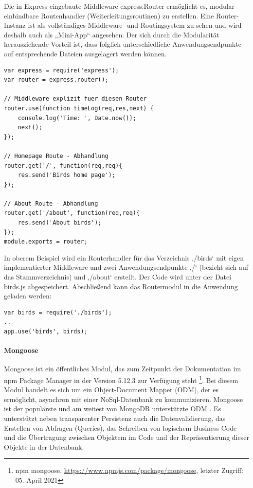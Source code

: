 \noindent
Die in Express eingebaute Middleware express.Router ermöglicht es, modular einbindbare Routenhandler (Weiterleitungsroutinen) zu erstellen. Eine Router-Instanz ist als vollständiges Middle\-ware- und Routingsystem zu sehen und wird deshalb auch als „Mini-App“ angesehen. Der sich durch die Modularität herausziehende Vorteil ist, dass folglich unterschiedliche Anwendungsendpunkte auf entsprechende Dateien ausgelagert werden können.
\newline

\begin{lstlisting}[caption=Routinghandler erstellen \protect \footnotemark,label=lst:RoutingHandlerCreate]
var express = require('express');
var router = express.router();

// Middleware explizit fuer diesen Router
router.use(function timeLog(req,res,next) {
	console.log('Time: ', Date.now());
	next();
});

// Homepage Route - Abhandlung
router.get('/', function(req,req){
	res.send('Birds home page');
});

// About Route - Abhandlung
router.get('/about', function(req,req){
	res.send('About birds');
});
module.exports = router;
\end{lstlisting}

\noindent
In oberem Beispiel wird ein Routerhandler für das Verzeichnis ‚/birds‘ mit eigen implementierter Middleware und zwei Anwendungsendpunkte ‚/‘ (bezieht sich auf das Stammverzeichnis) und ‚/about‘ erstellt. Der Code wird unter der Datei birds.js abgespeichert. 
Abschließend kann das Routermodul in die Anwendung geladen werden: 
\newline

\begin{lstlisting}[caption=Routinghandler benutzen,label=lst:RoutingHandlerUsage]
var birds = require('./birds');
..
app.use('birds', birds);
\end{lstlisting}

%
%
%

\newpage
\paragraph{Mongoose}
Mongoose ist ein öffentliches Modul, das zum Zeitpunkt der Dokumentation im npm Package Manager in der Version 5.12.3 zur Verfügung steht \footnote{npm mongoose. \url{https://www.npmjs.com/package/mongoose}, letzter Zugriff: 05. April 2021}. Bei diesem Modul handelt es sich um ein Object-Document Mapper (ODM), der es ermöglicht, asynchron mit einer NoSql-Datenbank zu kommunizieren. Mongoose ist der populärste und am weitest von MongoDB unterstützte ODM \cite{Node2.55}. Es unterstützt neben transparenter Persistenz auch die Datenvalidierung, das Erstellen von Abfragen (Queries), das Schreiben von logischem Business Code und die Übertragung zwischen Objektem im Code und der Repräsentierung dieser Objekte in der Datenbank.
\newline

